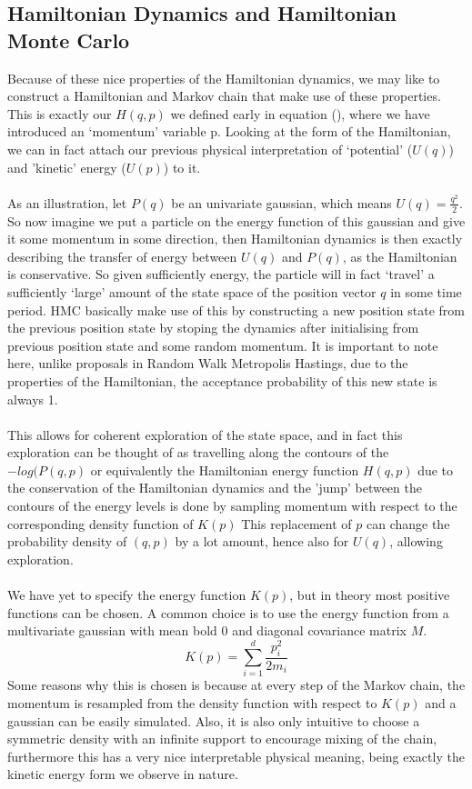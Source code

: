 \documentclass[11pt]{article}
\begin{document}
\subsection{Hamiltonian Dynamics and Hamiltonian Monte Carlo}
Because of these nice properties of the Hamiltonian dynamics, we may like to construct a Hamiltonian and Markov chain that make use of these properties. This is exactly our $H(q,p)$ we defined early in equation (), where we have introduced an `momentum' variable p. Looking at the form of the Hamiltonian, we can in fact attach our previous physical interpretation of `potential' ($U(q)$) and 'kinetic' energy ($U(p)$) to it. 
\\
\\
As an illustration, let $P(q)$ be an univariate gaussian, which means $U(q)=\frac{q^2}{2}$. So now imagine we put a particle on the energy function of this gaussian and give it some momentum in some direction, then Hamiltonian dynamics is then exactly describing the transfer of energy between $U(q)$ and $P(q)$, as the Hamiltonian is conservative. So given sufficiently energy, the particle will in fact `travel' a sufficiently `large' amount of the state space of the position vector $q$ in some time period. HMC basically make use of this by constructing a new position state from the previous position state by stoping the dynamics after initialising from previous position state and some random momentum. It is important to note here, unlike proposals in Random Walk Metropolis Hastings, due to the properties of the Hamiltonian, the acceptance probability of this new state is always 1. 
\\
\\
This allows for coherent exploration of the state space, and in fact this exploration can be thought of as  travelling along the contours of the $-log( P(q,p)$ or equivalently the Hamiltonian energy function $H(q,p)$ due to the conservation of the Hamiltonian dynamics and the 'jump' between the contours of the energy levels is done by sampling momentum with respect to the corresponding density function of $K(p)$ This replacement of $p$ can change the probability density of $(q,p)$ by a lot amount, hence also for $U(q)$, allowing exploration.
\\
\\
We have yet to specify the energy function $K(p)$, but in theory most positive functions can be chosen. A common choice is to use the energy function from a multivariate gaussian with mean bold 0 and diagonal covariance matrix $M$.
\begin{equation}
K(p) = \sum_{i=1}^{d} \frac{p_{i}^{2}}{2m_{i}}
\end{equation}
Some reasons why this is chosen is because at every step of the Markov chain, the momentum is resampled from the density function with respect to $K(p)$ and a gaussian can be easily simulated. Also, it is also only intuitive to choose a symmetric density with an infinite support to encourage mixing of the chain, furthermore this has a very nice interpretable physical meaning, being exactly the kinetic energy form we observe in nature. 
\end{document}
